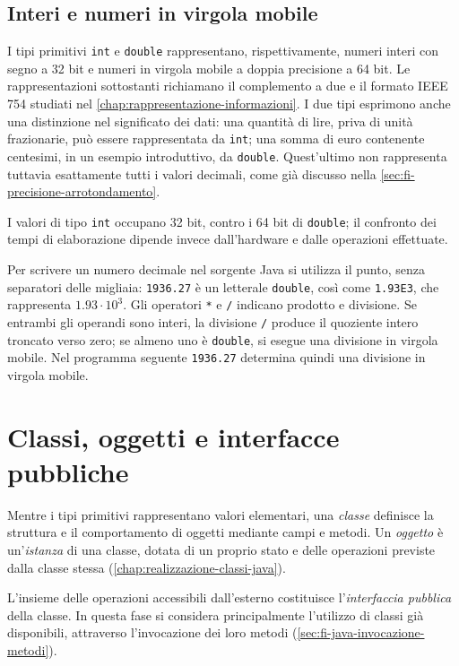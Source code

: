 \subsection{Interi e numeri in virgola mobile}
\label{sec:fi-java-tipi-numerici}

I tipi primitivi \texttt{int} e \texttt{double} rappresentano,
rispettivamente, numeri interi con segno a 32 bit e numeri in
virgola mobile a doppia precisione a 64 bit. Le rappresentazioni
sottostanti richiamano il complemento a due e il formato
IEEE 754 studiati nel \cref{chap:rappresentazione-informazioni}.
I due tipi esprimono anche una distinzione nel significato dei
dati: una quantità di lire, priva di unità frazionarie, può essere
rappresentata da \texttt{int}; una somma di euro contenente
centesimi, in un esempio introduttivo, da \texttt{double}.
Quest'ultimo non rappresenta tuttavia esattamente tutti i
valori decimali, come già discusso nella
\cref{sec:fi-precisione-arrotondamento}.

I valori di tipo \texttt{int} occupano 32 bit, contro i 64 bit
di \texttt{double}; il confronto dei tempi di elaborazione dipende
invece dall'hardware e dalle operazioni effettuate.

Per scrivere un numero decimale nel sorgente Java si utilizza
il punto, senza separatori delle migliaia: \texttt{1936.27}
è un letterale \texttt{double}, così come \texttt{1.93E3},
che rappresenta \(1.93\cdot10^3\). Gli operatori \texttt{*}
e \texttt{/} indicano prodotto e divisione. Se entrambi gli
operandi sono interi, la divisione \texttt{/} produce il
quoziente intero troncato verso zero; se almeno uno è
\texttt{double}, si esegue una divisione in virgola mobile.
Nel programma seguente \texttt{1936.27} determina quindi
una divisione in virgola mobile.



\section{Classi, oggetti e interfacce pubbliche}
\label{sec:fi-java-classi-oggetti}

Mentre i tipi primitivi rappresentano valori elementari, una
\emph{classe} definisce la struttura e il comportamento di oggetti
mediante campi e metodi. Un \emph{oggetto} è un'\emph{istanza}
di una classe, dotata di un proprio stato e delle operazioni
previste dalla classe stessa (\cref{chap:realizzazione-classi-java}).

L'insieme delle operazioni accessibili dall'esterno costituisce
l'\emph{interfaccia pubblica} della classe. In questa fase si
considera principalmente l'utilizzo di classi già disponibili,
attraverso l'invocazione dei loro metodi
(\cref{sec:fi-java-invocazione-metodi}).

